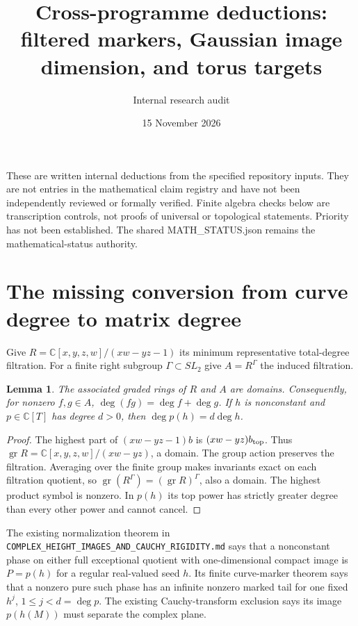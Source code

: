 \documentclass[11pt]{article}
\newtheorem{lemma}[proposition]{Lemma}
\newcommand{\C}{\mathbb C}
\begin{document}
\title{Cross-programme deductions: filtered markers, Gaussian image dimension, and torus targets}
\author{Internal research audit}
\date{15 November 2026}
\maketitle
These are written internal deductions from the specified repository inputs.
They are not entries in the mathematical claim registry and have not been
independently reviewed or formally verified. Finite algebra checks below
are transcription controls, not proofs of universal or topological statements.
Priority has not been established. The shared MATH\_STATUS.json remains the
mathematical-status authority.

\section{The missing conversion from curve degree to matrix degree}
Give $R=\C[x,y,z,w]/(xw-yz-1)$ its minimum representative total-degree
filtration. For a finite right subgroup $\Gamma\subset SL_2$ give
$A=R^\Gamma$ the induced filtration.
\begin{lemma}
The associated graded rings of $R$ and $A$ are domains. Consequently, for
nonzero $f,g\in A$, $\deg(fg)=\deg f+\deg g$. If $h$ is nonconstant and
$p\in\C[T]$ has degree $d>0$, then $\deg p(h)=d\deg h$.
\end{lemma}
\begin{proof}
The highest part of $(xw-yz-1)b$ is $(xw-yz)b_{\rm top}$. Thus
$\operatorname{gr}R=\C[x,y,z,w]/(xw-yz)$, a domain. The group action preserves
the filtration. Averaging over the finite group makes invariants exact
on each filtration quotient, so
$\operatorname{gr}(R^\Gamma)=(\operatorname{gr}R)^\Gamma$, also a domain.
The highest product symbol is nonzero. In $p(h)$ its top power has
strictly greater degree than every other power and cannot cancel.
\end{proof}

The existing normalization theorem in
\texttt{COMPLEX\_HEIGHT\_IMAGES\_AND\_CAUCHY\_RIGIDITY.md} says that a
nonconstant phase on either full exceptional quotient with one-dimensional
compact image is $P=p(h)$ for a regular real-valued seed $h$. Its finite
curve-marker theorem says that a nonzero pure such phase has an infinite
nonzero marked tail for one fixed $h^j$, $1\le j<d=\deg p$.
The existing Cauchy-transform exclusion says its image $p(h(M))$ must
separate the complex plane.
\end{document}
